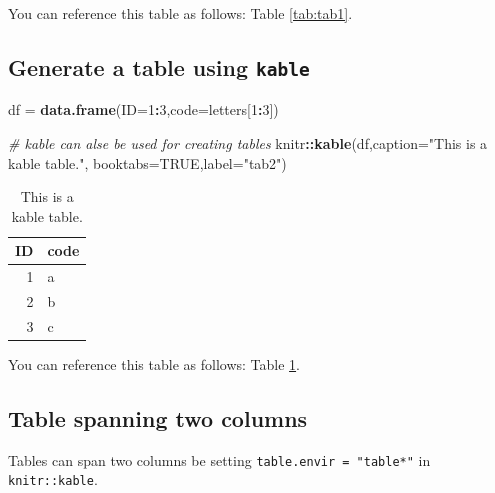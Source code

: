 \documentclass[webpdf,large,modern,namedate]{oup-authoring-template}
\newenvironment{Shaded}{\begin{snugshade}}{\end{snugshade}}
\newcommand{\AttributeTok}[1]{\textcolor[rgb]{0.13,0.29,0.53}{#1}}
\newcommand{\CommentTok}[1]{\textcolor[rgb]{0.56,0.35,0.01}{\textit{#1}}}
\newcommand{\ConstantTok}[1]{\textcolor[rgb]{0.56,0.35,0.01}{#1}}
\newcommand{\DecValTok}[1]{\textcolor[rgb]{0.00,0.00,0.81}{#1}}
\newcommand{\FunctionTok}[1]{\textcolor[rgb]{0.13,0.29,0.53}{\textbf{#1}}}
\newcommand{\NormalTok}[1]{#1}
\newcommand{\OtherTok}[1]{\textcolor[rgb]{0.56,0.35,0.01}{#1}}
\newcommand{\SpecialCharTok}[1]{\textcolor[rgb]{0.81,0.36,0.00}{\textbf{#1}}}
\newcommand{\StringTok}[1]{\textcolor[rgb]{0.31,0.60,0.02}{#1}}
\theoremstyle{thmstyleone}
\theoremstyle{thmstyletwo}
\theoremstyle{thmstylethree}
\begin{document}
You can reference this table as follows: Table \ref{tab:tab1}.

\hypertarget{generate-a-table-using-kable}{%
\subsection{\texorpdfstring{Generate a table using
\texttt{kable}}{Generate a table using kable}}\label{generate-a-table-using-kable}}

\begin{Shaded}
\begin{Highlighting}[]
\NormalTok{df }\OtherTok{=} \FunctionTok{data.frame}\NormalTok{(}\AttributeTok{ID=}\DecValTok{1}\SpecialCharTok{:}\DecValTok{3}\NormalTok{,}\AttributeTok{code=}\NormalTok{letters[}\DecValTok{1}\SpecialCharTok{:}\DecValTok{3}\NormalTok{])}

\CommentTok{\# kable can alse be used for creating tables}
\NormalTok{knitr}\SpecialCharTok{::}\FunctionTok{kable}\NormalTok{(df,}\AttributeTok{caption=}\StringTok{"This is a kable table."}\NormalTok{,}
             \AttributeTok{booktabs=}\ConstantTok{TRUE}\NormalTok{,}\AttributeTok{label=}\StringTok{"tab2"}\NormalTok{)}
\end{Highlighting}
\end{Shaded}

\begin{table}

\caption{\label{tab:tab2}This is a kable table.}
\centering
\begin{tabular}[t]{rl}
\toprule
ID & code\\
\midrule
1 & a\\
2 & b\\
3 & c\\
\bottomrule
\end{tabular}
\end{table}

You can reference this table as follows: Table \ref{tab:tab2}.

\hypertarget{table-spanning-two-columns}{%
\subsection{Table spanning two
columns}\label{table-spanning-two-columns}}

Tables can span two columns be setting \texttt{table.envir\ =\ "table*"}
in \texttt{knitr::kable}.
\end{document}
